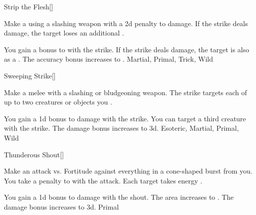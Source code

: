 \lowercase{\hypertarget{maneuver:Strip the Flesh}{}}\label{maneuver:Strip the Flesh}
\hypertarget{maneuver:Strip the Flesh}{}
\begin{freeability}[Rank 1]{Strip the Flesh}[]

Make a  using a slashing weapon with a \minus2d penalty to damage.
If the strike deals damage, the target loses an additional .

\rankline
{} You gain a  bonus to  with the strike.
 If the strike deals damage, the target is also  as a .
 The accuracy bonus increases to .
 Martial, Primal, Trick, Wild
\end{freeability}
\vspace{0.25em}



\lowercase{\hypertarget{maneuver:Sweeping Strike}{}}\label{maneuver:Sweeping Strike}
\hypertarget{maneuver:Sweeping Strike}{}
\begin{freeability}[Rank 1]{Sweeping Strike}[]

Make a melee  with a slashing or bludgeoning weapon.
The strike targets each of up to two creatures or objects you .

\rankline
{} You gain a \plus1d bonus to damage with the strike.
 You can target a third creature with the strike.
 The damage bonus increases to \plus3d.
 Esoteric, Martial, Primal, Wild
\end{freeability}
\vspace{0.25em}



\lowercase{\hypertarget{maneuver:Thunderous Shout}{}}\label{maneuver:Thunderous Shout}
\hypertarget{maneuver:Thunderous Shout}{}
\begin{freeability}[Rank 1]{Thunderous Shout}[]

Make an attack vs. Fortitude against everything in a \areamed cone-shaped burst from you.
You take a  penalty to  with the attack.
\hit Each target takes energy .

\rankline
{} You gain a \plus1d bonus to damage with the shout.
 The area increases to \arealarge.
 The damage bonus increases to \plus3d.
 Primal
\end{freeability}
\vspace{0.25em}



